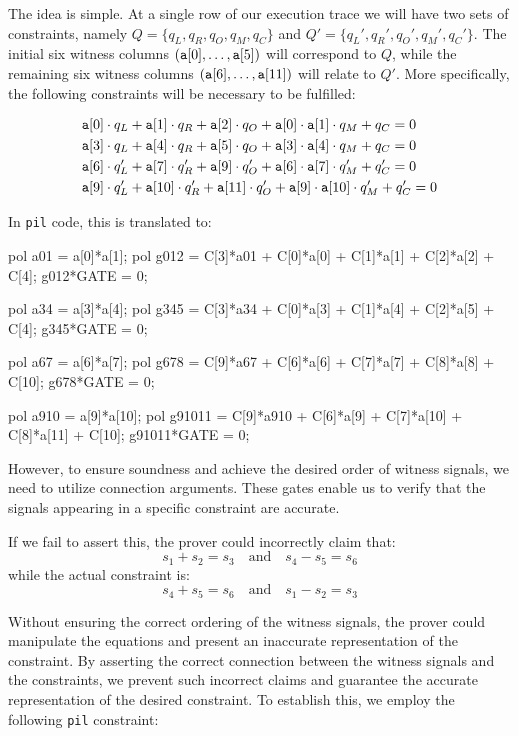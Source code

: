 The idea is simple. At a single row of our execution trace we will have two sets of \plonk constraints, namely $Q = \{ q_L, q_R, q_O, q_M, q_C \}$ and $Q' = \{ q_L', q_R', q_O', q_M', q_C' \}$. The initial six witness columns $(\texttt{a}[0], \dots, \texttt{a}[5])$ will correspond to $Q$, while the remaining six witness columns $(\texttt{a}[6], \dots, \texttt{a}[11])$ will relate to $Q'$. More specifically, the following constraints will be necessary to be fulfilled: 

\begin{align*}
&\texttt{a}[0] \cdot q_L + \texttt{a}[1] \cdot q_R + \texttt{a}[2] \cdot q_O + \texttt{a}[0] \cdot  \texttt{a}[1] \cdot q_M + q_C = 0 \\
&\texttt{a}[3] \cdot q_L + \texttt{a}[4] \cdot q_R + \texttt{a}[5] \cdot q_O + \texttt{a}[3] \cdot  \texttt{a}[4] \cdot q_M + q_C = 0 \\
&\texttt{a}[6] \cdot q_L' + \texttt{a}[7] \cdot q_R' + \texttt{a}[9] \cdot q_O' + \texttt{a}[6] \cdot  \texttt{a}[7] \cdot q_M' + q_C' = 0 \\
&\texttt{a}[9] \cdot q_L' + \texttt{a}[10] \cdot q_R' + \texttt{a}[11] \cdot q_O' + \texttt{a}[9] \cdot  \texttt{a}[10] \cdot q_M' + q_C' = 0
\end{align*}

In \texttt{pil} code, this is translated to:

\begin{pil}
pol a01 = a[0]*a[1];
pol g012 = C[3]*a01 + C[0]*a[0] + C[1]*a[1] + C[2]*a[2] + C[4];
g012*GATE = 0;

pol a34 = a[3]*a[4];
pol g345 = C[3]*a34 + C[0]*a[3] + C[1]*a[4] + C[2]*a[5] + C[4];
g345*GATE = 0;

pol a67 = a[6]*a[7];
pol g678 = C[9]*a67 + C[6]*a[6] + C[7]*a[7] + C[8]*a[8] + C[10];
g678*GATE = 0;

pol a910 = a[9]*a[10];
pol g91011 = C[9]*a910 + C[6]*a[9] + C[7]*a[10] + C[8]*a[11] + C[10];
g91011*GATE = 0;
\end{pil}

However, to ensure soundness and achieve the desired order of witness signals, we need to utilize connection arguments. These gates enable us to verify that the signals appearing in a specific \plonk constraint are accurate.

If we fail to assert this, the prover could incorrectly claim that:
\[
s_1 + s_2 = s_3 \quad \text{and} \quad s_4 - s_5 = s_6
\]
while the actual \plonk constraint is:
\[
s_4 + s_5 = s_6 \quad \text{and} \quad s_1 - s_2 = s_3
\]

Without ensuring the correct ordering of the witness signals, the prover could manipulate the equations and present an inaccurate representation of the \plonk constraint. By asserting the correct connection between the witness signals and the constraints, we prevent such incorrect claims and guarantee the accurate representation of the desired \plonk constraint. To establish this, we employ the following \texttt{pil} constraint:

